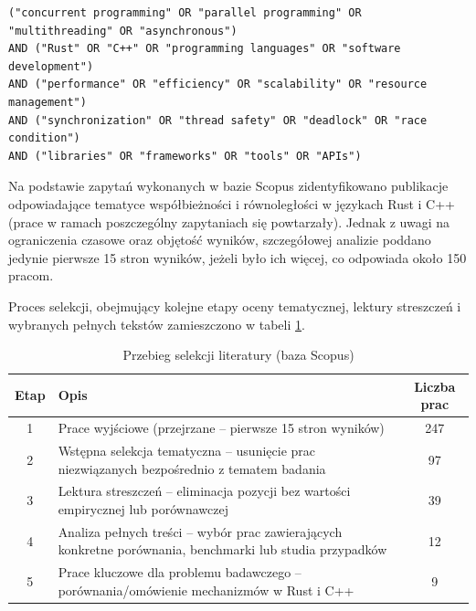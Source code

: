 \lstset{breaklines=true}
\begin{lstlisting}[caption=Kwerenda wygenerowana przez AI, label=AIQuery]
("concurrent programming" OR "parallel programming" OR "multithreading" OR "asynchronous")
AND ("Rust" OR "C++" OR "programming languages" OR "software development")
AND ("performance" OR "efficiency" OR "scalability" OR "resource management")
AND ("synchronization" OR "thread safety" OR "deadlock" OR "race condition")
AND ("libraries" OR "frameworks" OR "tools" OR "APIs")
\end{lstlisting}

Na podstawie zapytań wykonanych w bazie Scopus zidentyfikowano publikacje odpowiadające tematyce współbieżności i równoległości w językach Rust i C++ (prace w ramach poszczególny zapytaniach się powtarzały). Jednak z uwagi na ograniczenia czasowe oraz objętość wyników, szczegółowej analizie poddano jedynie pierwsze 15 stron wyników, jeżeli było ich więcej, co odpowiada około 150 pracom.

Proces selekcji, obejmujący kolejne etapy oceny tematycznej, lektury streszczeń i wybranych pełnych tekstów zamieszczono w tabeli \ref{table:selectionProcessScopus}.

\begin{table}[H]
    \caption{Przebieg selekcji literatury (baza Scopus)} 
    \label{table:selectionProcessScopus}
    \begin{tabular}{|c|p{11.5cm}|c|}
    \hline
    Etap & Opis & Liczba prac  \\ \hline 
    1 & Prace wyjściowe (przejrzane – pierwsze 15 stron wyników) & 247 \\ \hline 
    2 & Wstępna selekcja tematyczna – usunięcie prac niezwiązanych bezpośrednio z tematem badania & 97 \\ \hline 
    3 & Lektura streszczeń – eliminacja pozycji bez wartości empirycznej lub porównawczej & 39 \\ \hline 
    4 & Analiza pełnych treści – wybór prac zawierających konkretne porównania, benchmarki lub studia przypadków & 12 \\ \hline 
    5 & Prace kluczowe dla problemu badawczego – porównania/omówienie mechanizmów w Rust i C++ & 9 \\ \hline 
    \end{tabular} 
\end{table}

